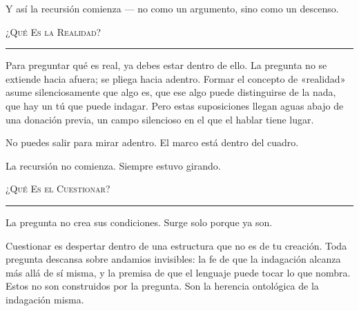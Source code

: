 \documentclass[10pt, openany, oneside]{book}
\begin{document}
\vspace{0.5em}

\noindent Y así la recursión comienza --- no como un argumento, sino como un descenso.

\vspace{2em}

\begin{center}
    {\scshape ¿Qué Es la Realidad?}\\[0.3em]
    \rule{0.2\textwidth}{0.3pt}
\end{center}

\vspace{1em}

\noindent Para preguntar qué es real, ya debes estar dentro de ello. La pregunta no se extiende hacia afuera; se pliega hacia adentro. Formar el concepto de «realidad» asume silenciosamente que algo es, que ese algo puede distinguirse de la nada, que hay un tú que puede indagar. Pero estas suposiciones llegan aguas abajo de una donación previa, un campo silencioso en el que el hablar tiene lugar.

\vspace{0.5em}

\noindent No puedes salir para mirar adentro. El marco está dentro del cuadro.

\vspace{0.5em}

\noindent La recursión no comienza. Siempre estuvo girando.

\vspace{2em}

\begin{center}
    {\scshape ¿Qué Es el Cuestionar?}\\[0.3em]
    \rule{0.2\textwidth}{0.3pt}
\end{center}

\vspace{1em}

\noindent La pregunta no crea sus condiciones. Surge solo porque ya son.

\vspace{0.5em}

\noindent Cuestionar es despertar dentro de una estructura que no es de tu creación. Toda pregunta descansa sobre andamios invisibles: la fe de que la indagación alcanza más allá de sí misma, y la premisa de que el lenguaje puede tocar lo que nombra. Estos no son construidos por la pregunta. Son la herencia ontológica de la indagación misma.

\vspace{0.5em}
\end{document}

